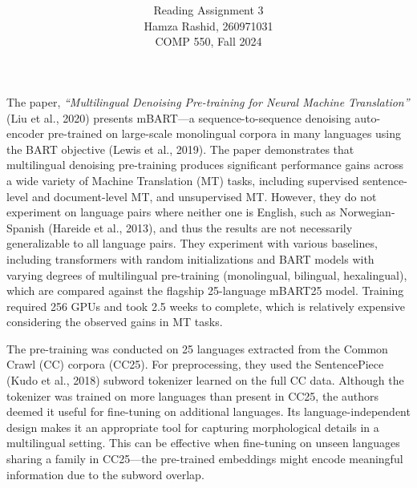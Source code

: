 \documentclass[11pt]{article}
\title{ }
\author{ Reading Assignment 3 \\ Hamza Rashid, 260971031 \\ COMP 550, Fall 2024}
\date{}
\begin{document}
\maketitle

\vspace{-5ex}
The paper, \textit{``Multilingual Denoising Pre-training for Neural Machine Translation''} (Liu et al., 2020) 
presents mBART---a sequence-to-sequence denoising
auto-encoder pre-trained on large-scale monolingual corpora 
in many languages using the BART objective (Lewis et al., 2019). 
The paper demonstrates that multilingual
denoising pre-training produces significant 
performance gains across a wide variety of
Machine Translation (MT) tasks, including supervised
sentence-level and document-level MT, 
and unsupervised MT. However, they do not experiment
on language pairs where neither one is English, such as Norwegian-Spanish (Hareide et al., 2013), and thus the results
are not necessarily generalizable to all language pairs. They experiment with various
baselines, including transformers with random initializations and BART models with varying degrees of multilingual
pre-training (monolingual, bilingual, hexalingual), which are compared against the flagship 25-language mBART25 model. 
Training required 256 GPUs and took 2.5 weeks to complete, which is relatively expensive considering the observed gains in MT tasks.

The pre-training was conducted on 25 languages extracted from the Common Crawl (CC) corpora (CC25).
For preprocessing, they used the SentencePiece (Kudo et al., 2018)
subword tokenizer learned on the full CC data. 
Although the tokenizer was trained on more languages than present in CC25, 
the authors deemed it useful for fine-tuning on additional languages. Its language-independent
design makes it an appropriate tool for capturing morphological details in a multilingual setting. 
This can be effective when fine-tuning on unseen languages
sharing a family in CC25---the pre-trained embeddings might encode meaningful
information due to the subword overlap.
\end{document}

